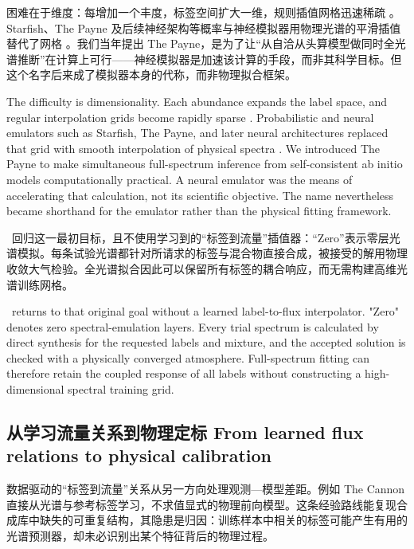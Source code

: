 困难在于维度：每增加一个丰度，标签空间扩大一维，规则插值网格迅速稀疏 \citep{Ting2016}。Starfish、The Payne 及后续神经架构等概率与神经模拟器用物理光谱的平滑插值替代了网格 \citep{Czekala2015,Ting2019,Rozanski2025a}。我们当年提出 The Payne，是为了让“从自洽从头算模型做同时全光谱推断”在计算上可行——神经模拟器是加速该计算的手段，而非其科学目标。但这个名字后来成了模拟器本身的代称，而非物理拟合框架。

\begin{EN}
The difficulty is dimensionality. Each abundance expands the label space, and
regular interpolation grids become rapidly sparse \citep{Ting2016}.
Probabilistic and neural emulators such as Starfish, The Payne, and later neural
architectures replaced that grid with smooth interpolation of physical spectra
\citep{Czekala2015,Ting2019,Rozanski2025a}. We introduced The Payne to make
simultaneous full-spectrum inference from self-consistent ab initio models
computationally practical. A neural emulator was the means of accelerating
that calculation, not its scientific objective. The name nevertheless became
shorthand for the emulator rather than the physical fitting framework.
\end{EN}

\paynezero\ 回归这一最初目标，且不使用学习到的“标签到流量”插值器：“Zero”表示零层光谱模拟。每条试验光谱都针对所请求的标签与混合物直接合成，被接受的解用物理收敛大气检验。全光谱拟合因此可以保留所有标签的耦合响应，而无需构建高维光谱训练网格。

\begin{EN}
\paynezero\ returns to that original goal without a learned label-to-flux
interpolator. "Zero" denotes zero spectral-emulation layers. Every trial
spectrum is calculated by direct synthesis for the requested labels and
mixture, and the accepted solution is checked with a physically converged
atmosphere. Full-spectrum fitting can therefore retain the coupled response of
all labels without constructing a high-dimensional spectral training grid.
\end{EN}

\subsection{从学习流量关系到物理定标 From learned flux relations to physical calibration}

数据驱动的“标签到流量”关系从另一方向处理观测—模型差距。例如 The Cannon 直接从光谱与参考标签学习，不求值显式的物理前向模型。这条经验路线能复现合成库中缺失的可重复结构，其隐患是归因：训练样本中相关的标签可能产生有用的光谱预测器，却未必识别出某个特征背后的物理过程。

